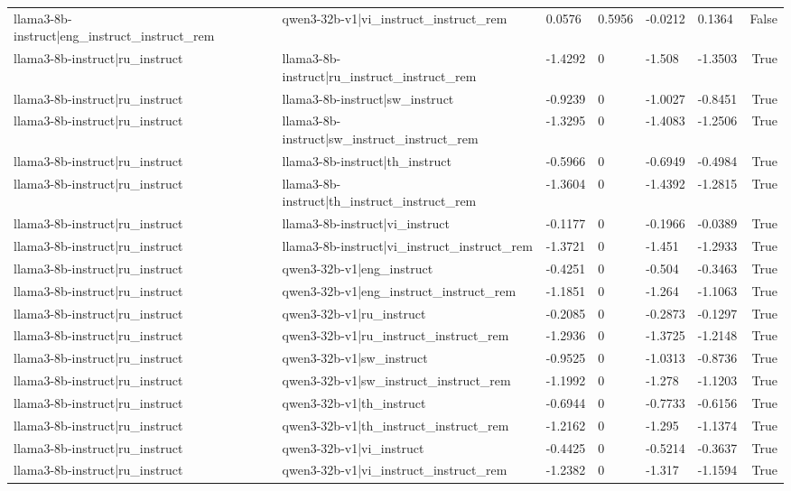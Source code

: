\begin{table}
\begin{tabular}{llllllr}
llama3-8b-instruct|eng_instruct_instruct_rem & qwen3-32b-v1|vi_instruct_instruct_rem & 0.0576 & 0.5956 & -0.0212 & 0.1364 & False \\
llama3-8b-instruct|ru_instruct & llama3-8b-instruct|ru_instruct_instruct_rem & -1.4292 & 0 & -1.508 & -1.3503 & True \\
llama3-8b-instruct|ru_instruct & llama3-8b-instruct|sw_instruct & -0.9239 & 0 & -1.0027 & -0.8451 & True \\
llama3-8b-instruct|ru_instruct & llama3-8b-instruct|sw_instruct_instruct_rem & -1.3295 & 0 & -1.4083 & -1.2506 & True \\
llama3-8b-instruct|ru_instruct & llama3-8b-instruct|th_instruct & -0.5966 & 0 & -0.6949 & -0.4984 & True \\
llama3-8b-instruct|ru_instruct & llama3-8b-instruct|th_instruct_instruct_rem & -1.3604 & 0 & -1.4392 & -1.2815 & True \\
llama3-8b-instruct|ru_instruct & llama3-8b-instruct|vi_instruct & -0.1177 & 0 & -0.1966 & -0.0389 & True \\
llama3-8b-instruct|ru_instruct & llama3-8b-instruct|vi_instruct_instruct_rem & -1.3721 & 0 & -1.451 & -1.2933 & True \\
llama3-8b-instruct|ru_instruct & qwen3-32b-v1|eng_instruct & -0.4251 & 0 & -0.504 & -0.3463 & True \\
llama3-8b-instruct|ru_instruct & qwen3-32b-v1|eng_instruct_instruct_rem & -1.1851 & 0 & -1.264 & -1.1063 & True \\
llama3-8b-instruct|ru_instruct & qwen3-32b-v1|ru_instruct & -0.2085 & 0 & -0.2873 & -0.1297 & True \\
llama3-8b-instruct|ru_instruct & qwen3-32b-v1|ru_instruct_instruct_rem & -1.2936 & 0 & -1.3725 & -1.2148 & True \\
llama3-8b-instruct|ru_instruct & qwen3-32b-v1|sw_instruct & -0.9525 & 0 & -1.0313 & -0.8736 & True \\
llama3-8b-instruct|ru_instruct & qwen3-32b-v1|sw_instruct_instruct_rem & -1.1992 & 0 & -1.278 & -1.1203 & True \\
llama3-8b-instruct|ru_instruct & qwen3-32b-v1|th_instruct & -0.6944 & 0 & -0.7733 & -0.6156 & True \\
llama3-8b-instruct|ru_instruct & qwen3-32b-v1|th_instruct_instruct_rem & -1.2162 & 0 & -1.295 & -1.1374 & True \\
llama3-8b-instruct|ru_instruct & qwen3-32b-v1|vi_instruct & -0.4425 & 0 & -0.5214 & -0.3637 & True \\
llama3-8b-instruct|ru_instruct & qwen3-32b-v1|vi_instruct_instruct_rem & -1.2382 & 0 & -1.317 & -1.1594 & True \\

\end{tabular}
\end{table}

